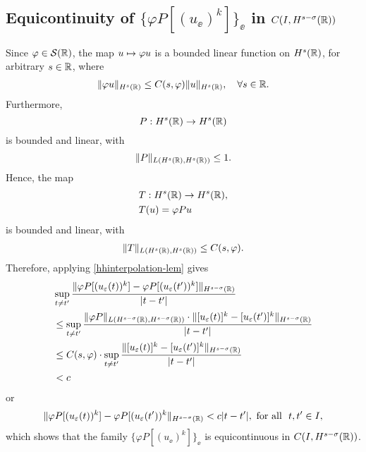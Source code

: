 \subsection{Equicontinuity of $\{ \varphi P [(u_\ee)^k]\}_\ee$  in $C(I,
H^{s-\sigma}(\mathbb{R}))$}
%
%
Since $\varphi \in \mathcal{S}(\mathbb{R})$, the map $u \mapsto \varphi u$
is a bounded linear function on $H^s(\mathbb{R})$, for arbitrary $s \in
\mathbb{R}$, where  
\begin{equation}
\begin{split}
\|\varphi u\|_{H^s(\mathbb{R})} \le C(s, \varphi)
\|u\|_{H^s(\mathbb{R})}, \quad \forall s\in \mathbb{R}.
\label{hhschwartz-estimate}
\end{split}
\end{equation}
Furthermore, $$P: H^s(\mathbb{R}) \to H^s(\mathbb{R})$$ is bounded and linear,
with 
\begin{equation}
\label{operator-normaa}
\|P\|_{L(H^s(\mathbb{R}), H^s(\mathbb{R}))} \le 1.
\end{equation}
Hence, the map 
\begin{equation}
\label{the-map}
\begin{split}
& T: H^s(\mathbb{R}) \to H^s(\mathbb{R}),
\\
& T(u) = \varphi P u 
\end{split}
\end{equation}
is bounded and linear, with 
\begin{equation}
\begin{split}
\|T\|_{L(H^s(\mathbb{R}), H^s(\mathbb{R}))} \le C(s, \varphi).
\label{op-norm-product}
\end{split}
\end{equation}
Therefore, applying \cref{hhinterpolation-lem} gives 
%
\begin{equation*}
\begin{split}
\label{hhequic-1}
& \sup_{t \neq t'} \frac {\| \varphi P [(u_\varepsilon(t))^k] - \varphi
P [(u_\varepsilon(t'))^k] \|_{H^{s -
\sigma  }(\mathbb{R})}}{|t - t'|}
\\
& \le \sup_{t \neq t'}  \frac {\|\varphi P \|_{L(H^{s-\sigma}(\mathbb{R}),
H^{s-\sigma}(\mathbb{R}))} \cdot \|   [u_\varepsilon(t)]^k  - 
[u_\varepsilon(t')]^k \|_{H^{s -
\sigma }(\mathbb{R})}}{|t - t'|}
\\
& \le C(s, \varphi) \cdot \sup_{t \neq t'}  \frac {\|   [u_\varepsilon(t)]^k  - 
[u_\varepsilon(t')]^k \|_{H^{s -
\sigma }(\mathbb{R})}}{|t - t'|}
\\
&< c
\end{split}
\end{equation*}
%
or
%
\begin{equation*}
\label{hhequic-2}
\|\varphi P [(u_\varepsilon(t))^k] - \varphi
P [(u_\varepsilon(t'))^k \|_{H^{s - \sigma }(\mathbb{R})}< c|t -
t'|, 
\ \text{for all} \   \,\,  t, t'\in I,
\end{equation*}
%
which shows that  the family  $\{\varphi P [(u_\ee)^k]\}_\ee$ is
equicontinuous in $C(I, H^{s-\sigma }(\mathbb{R}))$.  
%
%
%
%
%
%
%
%
%
%
%		
